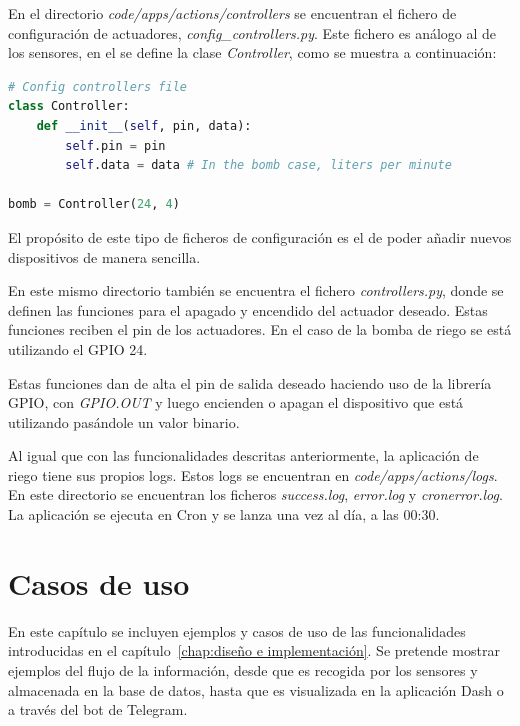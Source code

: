 \documentclass[a4paper, 12pt, oneside]{book}
\begin{document}
En el directorio \textit{code/apps/actions/controllers} se encuentran el fichero de configuración de actuadores, \textit{config\_controllers.py}. Este fichero es análogo al de los sensores, en el se define la clase \textit{Controller}, como se muestra a continuación:  

\begin{lstlisting}[language=Python]
# Config controllers file
class Controller:
    def __init__(self, pin, data):
        self.pin = pin
        self.data = data # In the bomb case, liters per minute

bomb = Controller(24, 4)
\end{lstlisting}

El propósito de este tipo de ficheros de configuración es el de poder añadir nuevos dispositivos de manera sencilla. 

En este mismo directorio también se encuentra el fichero \textit{controllers.py}, donde se definen las funciones para el apagado y encendido del actuador deseado. Estas funciones reciben el pin de los actuadores. En el caso de la bomba de riego se está utilizando el GPIO 24.

Estas funciones dan de alta el pin de salida deseado haciendo uso de la librería GPIO, con \textit{GPIO.OUT} y luego encienden o apagan el dispositivo que está utilizando pasándole un valor binario.

Al igual que con las funcionalidades descritas anteriormente, la aplicación de riego tiene sus propios logs. Estos logs se encuentran en \textit{code/apps/actions/logs}. En este directorio se encuentran los ficheros \textit{success.log}, \textit{error.log} y \textit{cronerror.log}.
La aplicación se ejecuta en Cron y se lanza una vez al día, a las 00:30.


\cleardoublepage
\chapter{Casos de uso}
\label{chap:casos de uso}

En este capítulo se incluyen ejemplos y casos de uso de las funcionalidades introducidas en el capítulo~\ref{chap:diseño e implementación}. Se pretende mostrar ejemplos del flujo de la información, desde que es recogida por los sensores y almacenada en la base de datos, hasta que es visualizada en la aplicación Dash o a través del bot de Telegram.
\end{document}

